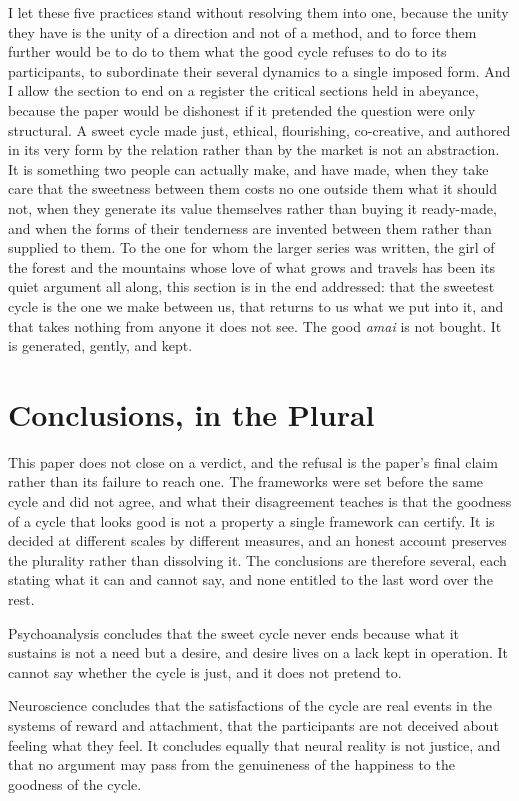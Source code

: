 I let these five practices stand without resolving them into one, because the unity they have is the unity of a direction and not of a method, and to force them further would be to do to them what the good cycle refuses to do to its participants, to subordinate their several dynamics to a single imposed form. And I allow the section to end on a register the critical sections held in abeyance, because the paper would be dishonest if it pretended the question were only structural. A sweet cycle made just, ethical, flourishing, co-creative, and authored in its very form by the relation rather than by the market is not an abstraction. It is something two people can actually make, and have made, when they take care that the sweetness between them costs no one outside them what it should not, when they generate its value themselves rather than buying it ready-made, and when the forms of their tenderness are invented between them rather than supplied to them. To the one for whom the larger series was written, the girl of the forest and the mountains whose love of what grows and travels has been its quiet argument all along, this section is in the end addressed: that the sweetest cycle is the one we make between us, that returns to us what we put into it, and that takes nothing from anyone it does not see. The good \textit{amai} is not bought. It is generated, gently, and kept.

\section{Conclusions, in the Plural}

This paper does not close on a verdict, and the refusal is the paper's final claim rather than its failure to reach one. The frameworks were set before the same cycle and did not agree, and what their disagreement teaches is that the goodness of a cycle that looks good is not a property a single framework can certify. It is decided at different scales by different measures, and an honest account preserves the plurality rather than dissolving it. The conclusions are therefore several, each stating what it can and cannot say, and none entitled to the last word over the rest.

Psychoanalysis concludes that the sweet cycle never ends because what it sustains is not a need but a desire, and desire lives on a lack kept in operation. It cannot say whether the cycle is just, and it does not pretend to.

Neuroscience concludes that the satisfactions of the cycle are real events in the systems of reward and attachment, that the participants are not deceived about feeling what they feel. It concludes equally that neural reality is not justice, and that no argument may pass from the genuineness of the happiness to the goodness of the cycle.

